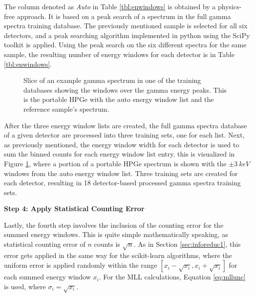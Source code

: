 The column denoted as \textit{Auto} in Table \ref{tbl:enwindows} is obtained by
a physics-free approach. It is based on a peak search of a spectrum in the full
gamma spectra training database. The previously mentioned sample is selected
for all six detectors, and a peak searching algorithm implemented in python
using the SciPy toolkit \cite{scipy} is applied. Using the peak search on the
six different spectra for the same sample, the resulting number of energy
windows for each detector is in Table \ref{tbl:enwindows}.  

\begin{figure}[!htb]
  \caption[Portion of gamma spectrum with windows, which shows summation regions 
           for spectra processing]
          {Slice of an example gamma spectrum in one of the training databases
           showing the windows over the gamma energy peaks. This is the portable
           \acrshort{HPGe} with the auto energy window list and the reference 
           sample's spectrum.}
  \label{fig:enwindows}
\end{figure}

After the three energy window lists are created, the full gamma spectra
database of a given detector are processed into three training sets, one for
each list.  Next, as previously mentioned, the energy window width for each
detector is used to sum the binned counts for each energy window list entry.
this is visualized in Figure \ref{fig:enwindows}, where a portion of a portable
\gls{HPGe} spectrum is shown with the $\pm3\:keV$ windows from the auto energy
window list.  Three training sets are created for each detector, resulting in
18 detector-based processed gamma spectra training sets.

\noindent \textbf{Step 4: Apply Statistical Counting Error}

Lastly, the fourth step involves the inclusion of the counting error for the
summed energy windows. This is quite simple mathematically speaking, as
statistical counting error of $n$ counts is $\sqrt{n}$.  As in Section
\ref{sec:inforeduc1}, this error gets applied in the same way for the
scikit-learn algorithms, where the uniform error is applied randomly within the
range $[x_i - \sqrt{x_i}, x_i + \sqrt{x_i}]$ for each summed energy window
$x_i$. For the \gls{MLL} calculations, Equation \ref{eq:mllunc} is used, where
$\sigma_{i} = \sqrt{x_i}$.  


